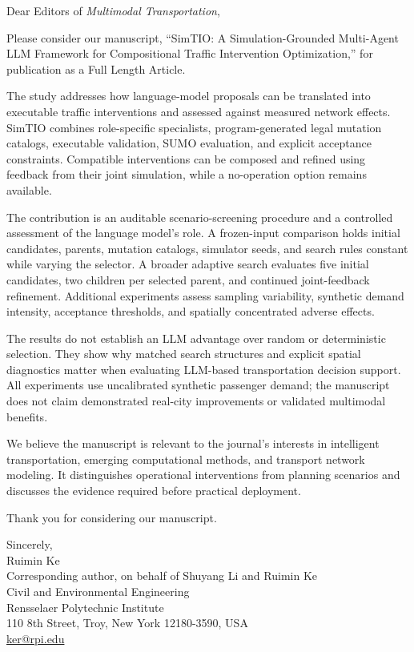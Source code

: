 \documentclass[11pt]{article}
\begin{document}
Dear Editors of \textit{Multimodal Transportation},

Please consider our manuscript, ``SimTIO: A Simulation-Grounded Multi-Agent LLM Framework for Compositional Traffic Intervention Optimization,'' for publication as a Full Length Article.

The study addresses how language-model proposals can be translated into executable traffic interventions and assessed against measured network effects. SimTIO combines role-specific specialists, program-generated legal mutation catalogs, executable validation, SUMO evaluation, and explicit acceptance constraints. Compatible interventions can be composed and refined using feedback from their joint simulation, while a no-operation option remains available.

The contribution is an auditable scenario-screening procedure and a controlled assessment of the language model's role. A frozen-input comparison holds initial candidates, parents, mutation catalogs, simulator seeds, and search rules constant while varying the selector. A broader adaptive search evaluates five initial candidates, two children per selected parent, and continued joint-feedback refinement. Additional experiments assess sampling variability, synthetic demand intensity, acceptance thresholds, and spatially concentrated adverse effects.

The results do not establish an LLM advantage over random or deterministic selection. They show why matched search structures and explicit spatial diagnostics matter when evaluating LLM-based transportation decision support. All experiments use uncalibrated synthetic passenger demand; the manuscript does not claim demonstrated real-city improvements or validated multimodal benefits.

We believe the manuscript is relevant to the journal's interests in intelligent transportation, emerging computational methods, and transport network modeling. It distinguishes operational interventions from planning scenarios and discusses the evidence required before practical deployment.

Thank you for considering our manuscript.

Sincerely,\\
Ruimin Ke\\
Corresponding author, on behalf of Shuyang Li and Ruimin Ke\\
Civil and Environmental Engineering\\
Rensselaer Polytechnic Institute\\
110 8th Street, Troy, New York 12180-3590, USA\\
\href{mailto:ker@rpi.edu}{ker@rpi.edu}
\end{document}
